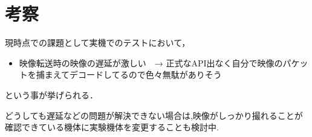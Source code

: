 \section{考察}

現時点での課題として実機でのテストにおいて，
\begin{itemize}
\item 映像転送時の映像の遅延が激しい　→  正式なAPI出なく自分で映像のパケットを捕まえてデコードしてるので色々無駄がありそう
\end{itemize}
という事が挙げられる．

どうしても遅延などの問題が解決できない場合は,映像がしっかり撮れることが確認できている機体に実験機体を変更することも検討中.

